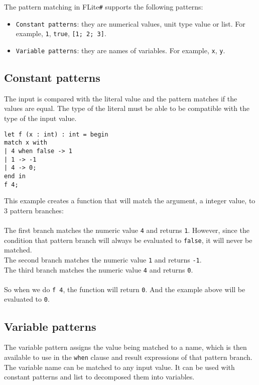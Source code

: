 \documentclass[]{article}
\begin{document}
		The pattern matching in FLite\verb|#| supports the following patterns:
		\begin{itemize}
			\item \verb|Constant patterns|: they are numerical values, unit type value or list.
			For example, \lstinline|1|, \lstinline|true|, \lstinline|[1; 2; 3]|.
			\item \verb|Variable patterns|: they are names of variables.
			For example, \lstinline|x|, \lstinline|y|.
		\end{itemize}

		\subsection{Constant patterns}
			The input is compared with the literal value and the pattern matches if the values are equal.
			The type of the literal must be able to be compatible with the type of the input value.\\
			\begin{lstlisting}[caption={Constant patterns example 1}, label=PMConstantEx1]
let f (x : int) : int = begin
match x with
| 4 when false -> 1
| 1 -> -1
| 4 -> 0;
end in
f 4;
			\end{lstlisting}

			This example creates a function that will match the argument, a integer value, to 3 pattern branches:\\\\
			
			The first branch matches the numeric value \lstinline|4| and returns \lstinline|1|.
			However, since the condition that pattern branch will always be evaluated to \lstinline|false|,
			it will never be matched.\\
			
			The second branch matches the numeric value \lstinline|1| and returns \lstinline|-1|.\\
			
			The third branch matches the numeric value \lstinline|4| and returns \lstinline|0|.\\\\

			So when we do \lstinline|f 4|, the function will return \lstinline|0|.
			And the example above will be evaluated to \lstinline|0|.

		\subsection{Variable patterns}
			The variable pattern assigns the value being matched to a name,
			which is then available to use in the \lstinline|when| clause and result expressions of that pattern branch.\\
			The variable name can be matched to any input value.
			It can be used with constant patterns and list to decomposed them into variables.\\
\end{document}
